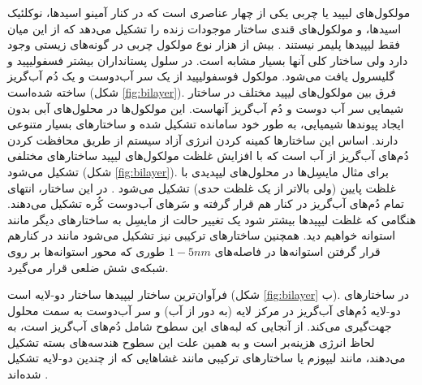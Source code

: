  
مولکول‌های لیپید یا چربی یکی از چهار عناصری است که در کنار آمینو اسید‌ها، نوکلئیک اسید‌ها، و مولکول‌های قندی ساختار موجودات زنده را تشکیل می‌دهد که از این میان فقط لیپید‌ها پلیمر نیستند
\cite{Membraneasamatteroffat}. بیش از هزار نوع مولکول چربی در گونه‌های زیستی وجود دارد ولی ساختار کلی آنها بسیار مشابه است. در سلول‌ پستانداران بیشتر فسفولیپید و گلیسرول یافت می‌شود. مولکول‌ فوسفولیپید از یک سر آب‌دوست و یک دُم آب‌گریز ساخته شده‌است (شکل
\ref{fig:bilayer}). فرق بین مولکول‌های لیپید مختلف در ساختار شیمایی سر آب دوست و دُم آب‌گریز آنهاست. این مولکول‌ها در محلول‌های آبی بدون ایجاد پیوندها شیمیایی، به طور خود سامانده تشکیل شده و ساختار‌های بسیار متنوعی دارند. اساس این ساختار‌ها کمینه کردن انرژی آزاد سیستم از طریق محافظت کردن دُم‌های آب‌گریز از آب است که با افزایش غلظت مولکول‌های لیپید ساختار‌های مختلفی تشکیل می‌شود
 (شکل
\ref{fig:bilayer}). برای مثال مایسِل‌ها
 در محلول‌های لیپدیدی با غلظت‌ پایین (ولی بالاتر از یک غلظت حدی) تشکیل می‌شود
 \cite{Lipowskyb1995ook}. در این ساختار، انتهای تمام دُم‌های آب‌گریز در کنار هم قرار گرفته و سَر‌های آب‌دوست کُره تشکیل می‌دهند. هنگامی‌ که غلظت لیپید‌ها بیشتر شود یک تغییر حالت از مایسِل به ساختارهای دیگر مانند استوانه خواهیم دید. همچنین ساختار‌های ترکیبی نیز تشکیل می‌شود مانند در کنارهم قرار گرفتن استوانه‌ها در فاصله‌های
  $1-5nm$
طوری که محور استوانه‌ها بر روی شبکه‌ی شش ضلعی قرار می‌گیرد. 
 
 فرآوان‌ترین ساختار لیپید‌ها ساختار دو-لایه ‌است (شکل
 \ref{fig:bilayer}
 ب).  در ساختار‌های دو-لایه دُم‌های  آب‌گریز در مرکز لایه (به دور از آب) و سر آب‌دوست به سمت محلول جهت‌گیری می‌کند. از آنجایی که لبه‌های این سطوح شامل دُم‌های آب‌گریز است، به لحاظ انرژی هزینه‌بر است و به همین علت این سطوح هندسه‌های بسته تشکیل می‌دهند، مانند لیپوزم
 یا ساختار‌های ترکیبی مانند غشا‌هایی که از چندین دو-لایه تشکیل شده‌اند
\cite{LifeAsaMatterofFat2005}.

